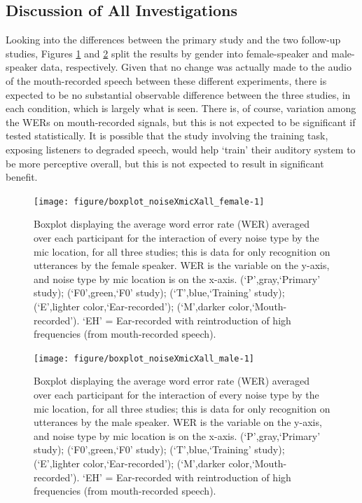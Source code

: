 \subsection{Discussion of All Investigations}
\label{chap3:glob_discussion}

Looking into the differences between the primary study and the two follow-up studies, Figures \ref{fig:female-all} and \ref{fig:male-all} split the results by gender into female-speaker and male-speaker data, respectively.  Given that no change was actually made to the audio of the mouth-recorded speech between these different experiments, there is expected to be no substantial observable difference between the three studies, in each condition, which is largely what is seen.  There is, of course, variation among the WERs on mouth-recorded signals, but this is not expected to be significant if tested statistically.  It is possible that the study involving the training task, exposing listeners to degraded speech, would help `train' their auditory system to be more perceptive overall, but this is not expected to result in significant benefit.




\begin{figure}[h!]

\texttt{[image: figure/boxplot\_noiseXmicXall\_female-1]} 

\caption{Boxplot displaying the average word error rate (WER) averaged over each participant for the interaction of every noise type by the mic location, for all three studies; this is data for only recognition on utterances by the female speaker. WER is the variable on the y-axis, and noise type by mic location is on the x-axis. (`P',gray,`Primary' study); (`F0',green,`F0' study); (`T',blue,`Training' study); (`E',lighter color,`Ear-recorded'); (`M',darker color,`Mouth-recorded'). `EH' = Ear-recorded with reintroduction of high frequencies (from mouth-recorded speech).}
\label{fig:female-all}
\end{figure}

\begin{figure}[h!]

\texttt{[image: figure/boxplot\_noiseXmicXall\_male-1]} 

\caption{Boxplot displaying the average word error rate (WER) averaged over each participant for the interaction of every noise type by the mic location, for all three studies; this is data for only recognition on utterances by the male speaker. WER is the variable on the y-axis, and noise type by mic location is on the x-axis. (`P',gray,`Primary' study); (`F0',green,`F0' study); (`T',blue,`Training' study); (`E',lighter color,`Ear-recorded'); (`M',darker color,`Mouth-recorded'). `EH' = Ear-recorded with reintroduction of high frequencies (from mouth-recorded speech).}
\label{fig:male-all}
\end{figure}


